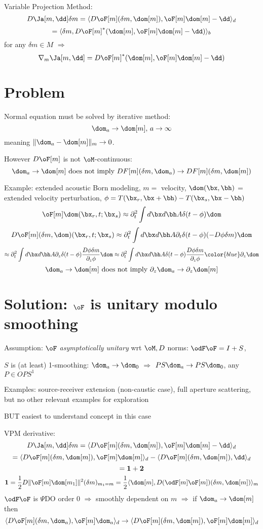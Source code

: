 Variable Projection Method:
\[
D\Ja[m,\dd]\delta m = \langle D\oF[m](\delta m,\dom[m]), \oF[m]\dom[m]-\dd\rangle_d
\]
\[
= \langle \delta m, D\oF[m]^*(\dom[m],\oF[m]\dom[m]-\dd) \rangle_b
\]
for any $\delta m \in M$ $\Rightarrow$
\[
\nabla_m \Ja[m,\dd] = D\oF[m]^*(\dom[m],\oF[m]\dom[m]-\dd)
\]

\section{Problem}
Normal equation must be solved by iterative method:
\[
\dom_a \rightarrow \dom[m],\, a \rightarrow \infty
\]
meaning $\|\dom_a-\dom[m]\|_m \rightarrow 0$.

However $D\oF[m]$ is not $\oM$-continuous:
\[
\dom_a \rightarrow \dom[m] \mbox{ does not imply } DF[m](\delta m,\dom_a) \rightarrow DF[m](\delta m, \dom[m])
\]


Example: extended acoustic Born modeling, $m=$ velocity, $\dom(\bx,\bh)$ = extended velocity perturbation, $\phi = T(\bx_r,\bx+\bh)-T(\bx_s,\bx-\bh)$
\[
\oF[m]\dom(\bx_r,t;\bx_s)  \approx \partial_t^2 \int d\bx d\bh A \delta(t-\phi) \dom
\]
\[
D\oF[m](\delta m,\dom) (\bx_r,t;\bx_s) \approx \partial_t^2 \int d\bx d\bh A
\partial_t \delta(t-\phi)(-D\phi \delta m)\dom
\]
\[
 \approx \partial_t^2 \int d\bx d\bh A\partial_z\delta(t-\phi)\frac{D\phi \delta m}{\partial_z \phi} \dom
 \approx \partial_t^2 \int d\bx d\bh A\delta(t-\phi)\frac{D\phi \delta m}{\partial_z \phi}{\color{blue} \partial_z} \dom
 \]
 \[
\dom_a \rightarrow \dom[m] \mbox{ does not imply } \partial_z \dom_a \rightarrow \partial_z \dom[m]
\]

\section{Solution: $\oF$ is unitary modulo smoothing}

Assumption: $\oF$ {\em asymptotically unitary} wrt $\oM, D$ norms: $\odF\oF = I + S$, 

$S$ is (at least) 1-smoothing: $\dom_a \rightarrow \dom_0$ $\Rightarrow$ $P S \dom_a \rightarrow  P S\dom_0$, any $P \in OPS^1$

Examples: source-receiver extension (non-caustic case), full aperture scattering, but no other relevant examples for exploration

BUT easiest to understand concept in this case

VPM derivative:
\[
D\Ja[m,\dd]\delta m = \langle D\oF[m](\delta m,\dom[m]), \oF[m]\dom[m]-\dd\rangle_d
\]
\[
= \langle D\oF[m](\delta m,\dom[m]),\oF[m]\dom[m]\rangle_d -\langle D\oF[m](\delta m,\dom[m]),\dd\rangle_d
\]
\[
= {\bf 1} + {\bf 2}
\]
\[
{\bf 1} = \frac{1}{2}D\|\oF[m]\dom[m_1]\|^2(\delta m)_{m_1=m} = \frac{1}{2}\langle \dom[m], D(\odF[m]\oF[m])(\delta m, \dom[m])\rangle_m
\]
$\odF\oF$ is $\Psi$DO order 0 $\Rightarrow$ smoothly dependent on $m$ $\Rightarrow$ if $\dom_a \rightarrow \dom[m]$ then
\[
\langle D\oF[m](\delta m,\dom_a),\oF[m]\dom_a\rangle_d \rightarrow \langle D\oF[m](\delta m,\dom[m]),\oF[m]\dom[m]\rangle_d 
\]

